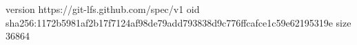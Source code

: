 version https://git-lfs.github.com/spec/v1
oid sha256:1172b5981af2b17f7124af98de79add793838d9c776ffcafce1c59e62195319e
size 36864
